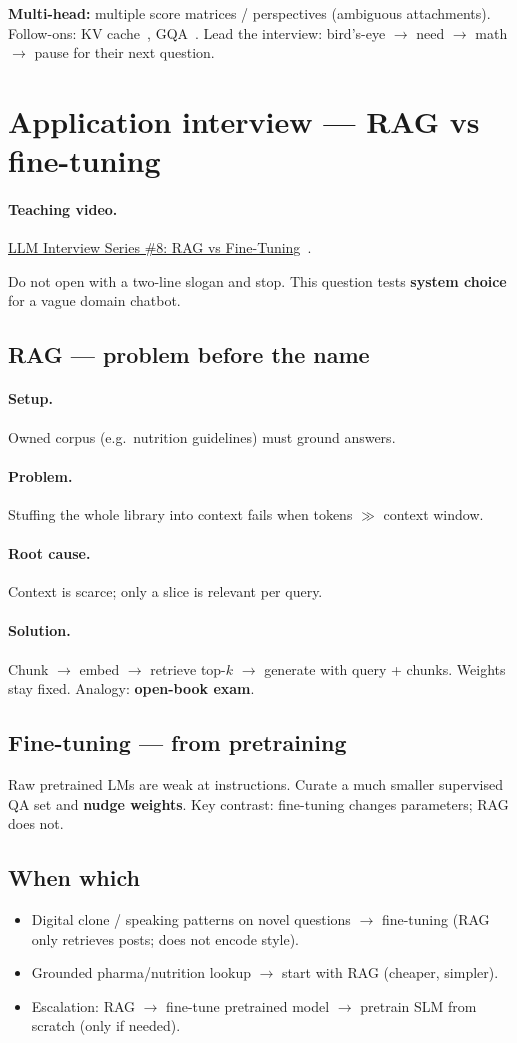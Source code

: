 \documentclass[11pt,a4paper]{article}
\newcommand{\setup}{\paragraph{Setup.}}
\newcommand{\problem}{\paragraph{Problem.}}
\newcommand{\rootcause}{\paragraph{Root cause.}}
\newcommand{\solution}{\paragraph{Solution.}}
\begin{document}
\textbf{Multi-head:} multiple score matrices / perspectives (ambiguous attachments).
Follow-ons: KV cache~\cite{vizuara-kv-yt}, GQA~\cite{vizuara-gqa-yt}.
Lead the interview: bird's-eye $\to$ need $\to$ math $\to$ pause for their next question.

\section{Application interview --- RAG vs fine-tuning}
\paragraph{Teaching video.}
\href{https://www.youtube.com/watch?v=cCXjumE70-g}{LLM Interview Series \#8: RAG vs Fine-Tuning}~\cite{vizuara-rag-ft-yt}.

Do not open with a two-line slogan and stop. This question tests \textbf{system choice} for a vague domain chatbot.

\subsection{RAG --- problem before the name}
\setup Owned corpus (e.g.\ nutrition guidelines) must ground answers.
\problem Stuffing the whole library into context fails when tokens $\gg$ context window.
\rootcause Context is scarce; only a slice is relevant per query.
\solution Chunk $\to$ embed $\to$ retrieve top-$k$ $\to$ generate with query + chunks.
Weights stay fixed. Analogy: \textbf{open-book exam}.

\subsection{Fine-tuning --- from pretraining}
Raw pretrained LMs are weak at instructions. Curate a much smaller supervised QA set and \textbf{nudge weights}.
Key contrast: fine-tuning changes parameters; RAG does not.

\subsection{When which}
\begin{itemize}
  \item Digital clone / speaking patterns on novel questions $\to$ fine-tuning (RAG only retrieves posts; does not encode style).
  \item Grounded pharma/nutrition lookup $\to$ start with RAG (cheaper, simpler).
  \item Escalation: RAG $\to$ fine-tune pretrained model $\to$ pretrain SLM from scratch (only if needed).
\end{itemize}
\end{document}
